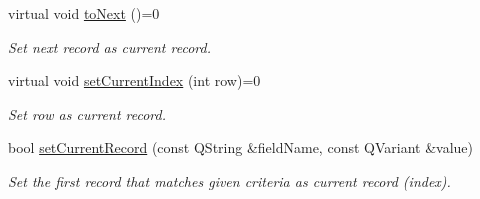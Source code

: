 \begin{DoxyCompactItemize}
virtual void \hyperlink{classmdt_abstract_sql_widget_a8ed6bb811c992fcc8bba8da9f675cd88}{to\-Next} ()=0
\begin{DoxyCompactList}\small\item\em Set next record as current record. \end{DoxyCompactList}\item 
virtual void \hyperlink{classmdt_abstract_sql_widget_a619725b15f305e216ba9ce9dc0ab9e3c}{set\-Current\-Index} (int row)=0
\begin{DoxyCompactList}\small\item\em Set row as current record. \end{DoxyCompactList}\item 
bool \hyperlink{classmdt_abstract_sql_widget_a49624704409e34459084201ccb8e9399}{set\-Current\-Record} (const Q\-String \&field\-Name, const Q\-Variant \&value)
\begin{DoxyCompactList}\small\item\em Set the first record that matches given criteria as current record (index). \end{DoxyCompactList}\end{DoxyCompactItemize}
